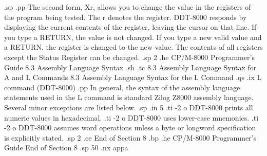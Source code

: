 .sp 
.pp
The second form, Xr, allows you to change the value in the registers 
of the program being tested.  The r denotes the register.  
DDT-8000 responds by displaying the current contents of the register, leaving 
the cursor on that line.  If you type a RETURN, the value is not 
changed.  If you type a new valid value and a RETURN, the register is 
changed to the new value.  The contents of all registers 
except the Status Register can be changed. 
.sp 2
.he CP/M-8000 Programmer's Guide         8.3  Assembly Language Syntax
.sh
.tc    8.3  Assembly Language Syntax for A and L Commands
8.3  Assembly Language Syntax for the L Command
.qs
.ix L command (DDT-8000)
.pp 
In general, the syntax of the assembly language statements used in the L
command is standard Zilog Z8000 assembly language.  Several minor 
exceptions are 
listed below.
.sp 
.in 5
.ti -2
o DDT-8000 prints all numeric values in hexadecimal.
.ti -2
o DDT-8000 uses lower-case mnemonics.
.ti -2
o DDT-8000 assumes word operations unless a byte or longword specification
is explicitly stated. 
.sp 2
.ce
End of Section 8
.bp
.he CP/M-8000 Programmer's Guide                      End of Section 8
.sp 50
.nx appa


